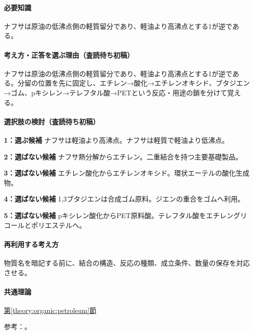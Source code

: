 \paragraph{必要知識} ナフサは原油の低沸点側の軽質留分であり、軽油より高沸点とする1が逆である。

\paragraph{考え方・正答を選ぶ理由（査読待ち初稿）} ナフサは原油の低沸点側の軽質留分であり、軽油より高沸点とする1が逆である。分留の位置を先に固定し、エチレン→酸化→エチレンオキシド、ブタジエン→ゴム、pキシレン→テレフタル酸→PETという反応・用途の鎖を分けて覚える。

\paragraph{選択肢の検討（査読待ち初稿）}\mbox{}\par

\noindent\textbf{1：選ぶ候補} ナフサは軽油より高沸点。ナフサは軽質で軽油より低沸点。\par

\noindent\textbf{2：選ばない候補} ナフサ熱分解からエチレン。二重結合を持つ主要基礎製品。\par

\noindent\textbf{3：選ばない候補} エチレン酸化からエチレンオキシド。環状エーテルの酸化生成物。\par

\noindent\textbf{4：選ばない候補} 1,3ブタジエンは合成ゴム原料。ジエンの重合をゴムへ利用。\par

\noindent\textbf{5：選ばない候補} pキシレン酸化からPET原料酸。テレフタル酸をエチレングリコールとポリエステルへ。\par

\paragraph{再利用する考え方} 物質名を暗記する前に、結合の構造、反応の種類、成立条件、数量の保存を対応させる。

\paragraph{共通理論} \hyperref[theory:organic:petroleum]{第\ref*{theory:organic:petroleum}節}

\par 参考：\cite{organic_jpca_dict,organic_step}。

